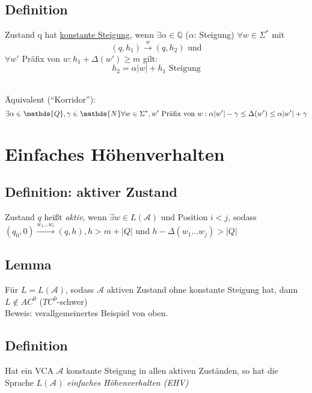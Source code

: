     \subsection{Definition}
        Zustand q hat \underline{konstante Steigung}, wenn $\exists \alpha \in \mathds{Q}$ ($\alpha$: Steigung) $\forall w \in \Sigma^*$ mit $$ (q,h_1) \xrightarrow{w} (q,h_2)\text{ und}$$
        $\forall w'$ Präfix von $w: h_1 + \Delta(w') \geq m$ gilt:
        $$h_2 = \alpha|w|+h_1 \text{ Steigung}$$
        \\
        Äquivalent (``Korridor''): $$\exists\alpha\in\mathds{Q},\gamma\in\mathds{N}\forall w\in\Sigmas,w'\text{ Präfix von }w:\alpha|w'|-\gamma\le\Delta(w')\le\alpha|w'|+\gamma$$
\section{Einfaches Höhenverhalten}
    \subsection{Definition: aktiver Zustand}
        Zustand $q$ heißt \emph{aktiv}, wenn $\exists w\in L(\mathcal{A})$ und Position $i<j$, sodass $(q_0,0)\overset{w_1\dots w_i}{\longrightarrow}(q,h),h>m+|Q|$ und $h-\Delta(w_1\dots w_j)>|Q|$
    \subsection{Lemma}
        Für $L=L(\mathcal{A})$, sodass $\mathcal{A}$ aktiven Zustand ohne konstante Steigung hat, dann $L\not\in AC^0$ ($TC^0$-schwer)\\
        Beweis: verallgemeinertes Beispiel von oben.
    \subsection{Definition}
        Hat ein VCA $\mathcal{A}$ konstante Steigung in allen aktiven Zuständen, so hat die Sprache $L(\mathcal{A})$ \emph{einfaches Höhenverhalten (EHV)}
